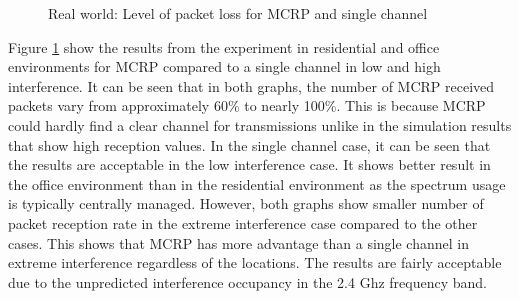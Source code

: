 
\begin{figure}
\centering
{}
\caption{Real world: Level of packet loss for MCRP and single channel}
\label{fig:hardware}
\end{figure}

Figure \ref{fig:hardware} show the results from the experiment in residential and office environments for MCRP compared to a single channel in low and high interference. It can be seen that in both graphs, the number of MCRP received packets vary from approximately 60\% to nearly 100\%. This is because MCRP could hardly find a clear channel for transmissions unlike in the simulation results that show high reception values.
In the single channel case, it can be seen that the results are acceptable in the low interference case. It shows better result in the office environment than in the residential environment as the spectrum usage is typically centrally managed. However, both graphs show smaller number of packet reception rate in the extreme interference case compared to the other cases. This shows that MCRP has more advantage than a single channel in extreme interference regardless of the locations. The results are fairly acceptable due to the unpredicted interference occupancy in the 2.4 Ghz frequency band.



